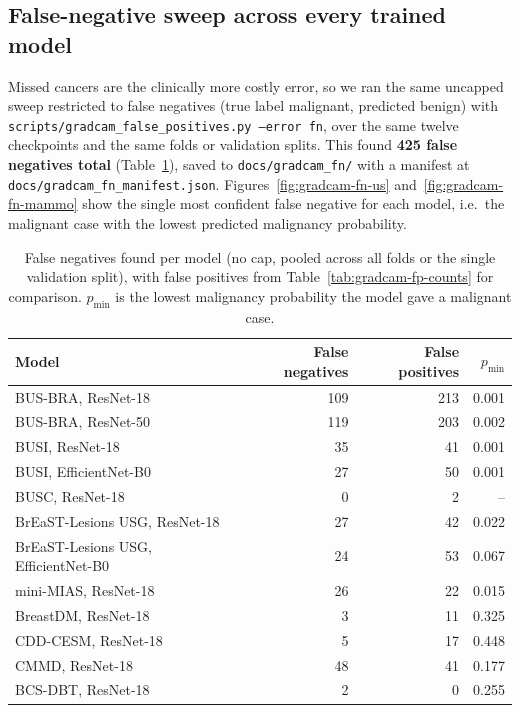 \documentclass[11pt]{article}
\begin{document}
\subsection{False-negative sweep across every trained model}
\label{sec:gradcam-fn}

Missed cancers are the clinically more costly error, so we ran the same
uncapped sweep restricted to false negatives (true label malignant,
predicted benign) with
\texttt{scripts/gradcam\_false\_positives.py --error fn}, over the same
twelve checkpoints and the same folds or validation splits. This found
\textbf{425 false negatives total} (Table~\ref{tab:gradcam-fn-counts}),
saved to \texttt{docs/gradcam\_fn/} with a manifest at
\texttt{docs/gradcam\_fn\_manifest.json}.
Figures~\ref{fig:gradcam-fn-us} and~\ref{fig:gradcam-fn-mammo} show the
single most confident false negative for each model, i.e.\ the malignant
case with the lowest predicted malignancy probability.

\begin{table}[htbp]
  \centering
  \caption{False negatives found per model (no cap, pooled across all folds or the single validation split), with false positives from Table~\ref{tab:gradcam-fp-counts} for comparison. $p_{\min}$ is the lowest malignancy probability the model gave a malignant case.}
  \label{tab:gradcam-fn-counts}
  \begin{tabular}{lrrr}
    \toprule
    Model & False negatives & False positives & $p_{\min}$ \\
    \midrule
    BUS-BRA, ResNet-18 & 109 & 213 & 0.001 \\
    BUS-BRA, ResNet-50 & 119 & 203 & 0.002 \\
    BUSI, ResNet-18 & 35 & 41 & 0.001 \\
    BUSI, EfficientNet-B0 & 27 & 50 & 0.001 \\
    BUSC, ResNet-18 & 0 & 2 & -- \\
    BrEaST-Lesions USG, ResNet-18 & 27 & 42 & 0.022 \\
    BrEaST-Lesions USG, EfficientNet-B0 & 24 & 53 & 0.067 \\
    mini-MIAS, ResNet-18 & 26 & 22 & 0.015 \\
    BreastDM, ResNet-18 & 3 & 11 & 0.325 \\
    CDD-CESM, ResNet-18 & 5 & 17 & 0.448 \\
    CMMD, ResNet-18 & 48 & 41 & 0.177 \\
    BCS-DBT, ResNet-18 & 2 & 0 & 0.255 \\
    \bottomrule
  \end{tabular}
\end{table}
\end{document}
